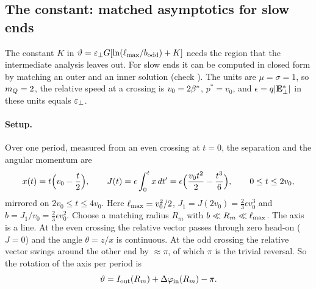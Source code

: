 \subsection{The constant: matched asymptotics for slow ends}\label{app:der:nr}
The constant $K$ in $\vartheta=\varepsilon_\perp G[\ln(\ell_{\max}/b_{\rm odd})+K]$ needs the region that the intermediate analysis leaves out. For
slow ends it can be computed in closed form by matching an outer and an inner solution (check ). The units are
$\mu=\sigma=1$, so $m_Q=2$, the relative speed at a crossing is $v_0=2\beta^*$, $p^*=v_0$, and $\epsilon=q|\mathbf{E}^*_\perp|$
in these units equals $\varepsilon_\perp$.

\paragraph{Setup.} Over one period, measured from an even crossing at $t=0$, the separation and the angular momentum
are
\begin{equation}
  x(t)=t\Bigl(v_0-\frac t2\Bigr),\qquad J(t)=\epsilon\int_0^tx\,dt'=\epsilon\Bigl(\frac{v_0t^2}{2}-\frac{t^3}{6}\Bigr),
  \qquad 0\le t\le2v_0,
\end{equation}
mirrored on $2v_0\le t\le4v_0$. Here $\ell_{\max}=v_0^2/2$, $J_1=J(2v_0)=\tfrac23\epsilon v_0^3$ and
$b=J_1/v_0=\tfrac23\epsilon v_0^2$. Choose a matching radius $R_m$ with $b\ll R_m\ll\ell_{\max}$. The axis is a line. At the
even crossing the relative vector passes through zero head-on ($J=0$) and the angle $\theta=z/x$ is continuous. At the
odd crossing the relative vector swings around the other end by $\approx\pi$, of which $\pi$ is the trivial reversal.
So the rotation of the axis per period is
\begin{equation}
  \vartheta=I_{\rm out}(R_m)+\Delta\varphi_{\rm in}(R_m)-\pi .
\end{equation}

